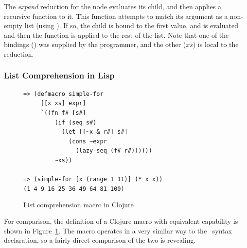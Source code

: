 The \emph{expand} reduction for the  node evaluates its  child, and then applies a recursive function to it. This function attempts to match its argument as a non-empty list (using ). If so, the  child is bound to the first value, and  is evaluated and then the function is applied to the rest of the list. Note that one of the bindings () was supplied by the programmer, and the other ($xs$) is local to the reduction. %


\subsubsection{List Comprehension in Lisp}

\begin{figure}[t]
\centering
\begin{verbatim}
=> (defmacro simple-for
     [[x xs] expr]
     `((fn f# [s#]
         (if (seq s#)
           (let [[~x & r#] s#]
             (cons ~expr
               (lazy-seq (f# r#))))))
         ~xs))

=> (simple-for [x (range 1 11)] (* x x))
(1 4 9 16 25 36 49 64 81 100)
\end{verbatim}

\caption{List comprehension macro in Clojure}
\label{fig-for-lisp}
\end{figure}

For comparison, the definition of a Clojure macro with equivalent capability is shown in Figure~\ref{fig-for-lisp}. The macro operates in a very similar way to the \Meta\ syntax declaration, so a fairly direct comparison of the two is revealing.


